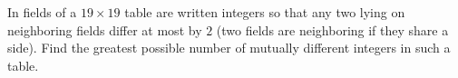 In fields of a $19 \times 19$ table are written integers so that any two lying on neighboring fields differ at most by $2$ (two fields are neighboring if they share a side). Find the greatest possible number of mutually different integers in such a table.
